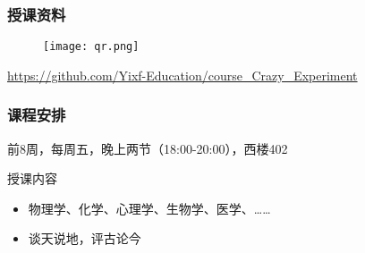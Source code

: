 \begin{frame}
  \frametitle{授课资料}
  \begin{figure}
    \centering
    \texttt{[image: qr.png]}
  \end{figure}
  \begin{center}
  \href{https://github.com/Yixf-Education/course_Crazy_Experiment}{https://github.com/Yixf-Education/course\_Crazy\_Experiment}
  \end{center}
\end{frame}



\begin{frame}
  \frametitle{课程安排}
  \begin{center}
  \alert{前8周，每周五，晚上两节（18:00-20:00），西楼402}\\
  \vspace{0.2cm}
  \end{center}
  \begin{block}{授课内容}
    \begin{itemize}
      \item 物理学、化学、心理学、生物学、医学、……
      \item 谈天说地，评古论今
    \end{itemize}
  \end{block}
\end{frame}

